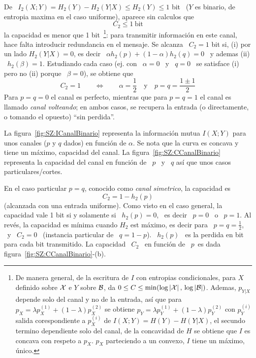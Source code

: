 %
\noindent De  \ $I_2(X;Y) = H_2(Y)  - H_2(Y|X) \le H_2(Y)  \le 1$ bit  \ ($Y$ es
binario, de entropia maxima en el caso uniforme), aparece sin calculos que
%
\[
C_2 \le 1 \: \mbox{bit}
\]
%
\ie la capacidad es menor que 1 bit~\footnote{De manera general, de la escritura
  de $I$ con  entropias condicionales, para $X$ definido sobre  $\mathcal{X}$ e $Y$ sobre
  $\mathcal{B}$, da $0 \le C \le \min( \log  |\mathcal{X}| \, , \, \log |\mathcal{B}| )$. Ademas, $p_{Y|X}$
  depende solo  del canal  y no  de la entrada,  as\'i que  para $p_X  = \lambda
  p_X^{(1)}  + (1-\lambda)  p_X^{(2)}$ se  obtiene  $p_Y =  \lambda p_Y^{(1)}  +
  (1-\lambda) p_Y^{(2)}$ con $p_Y^{(i)}$  salida corespondiente a $p_X^{(i)}$ de
  $I(X;Y) = H(Y)-H(Y|X)$,  el secundo termino dependiente solo  del canal, de la
  concavidad de  $H$ se obtiene  que $I$ es  concava con respeto a  $p_X$. $p_X$
  parteciendo a  un convexo, $I$  tiene un m\'aximo, \'unico.}:  para transmitir
informaci\'on en  este canal, hace  falta introducir redundancia en  el mensaje.
Se alcanza  \ $C_2  = 1$  bit si, (i)  por un  lado $H_2(Y|X) =  0$, es  decir \
$\alpha h_2(p)  + (1-\alpha) h_2(q)  = 0$  \ y ademas  (ii) \ $h_2(\beta)  = 1$.
Estudiando cada caso (ej.  con  \ $\alpha = 0$ \ y \ $q =  0$ \ se satisface (i)
pero no (ii) porque \ $\beta = 0$), se obtiene que
%
\[
C_2 = 1 \qquad \Leftrightarrow \qquad \alpha  = \frac12 \quad \mbox{y} \quad p = q
= \frac{1 \pm 1}{2}
\]
%
Para $p = q = 0$ el canal es perfecto, mientras que para $p = q = 1$ el canal es
llamado  {\it  canal volteando};  en  ambos casos,  se  recupera  la entrada  (o
directamente, o tomando el opuesto) ``sin perdida''.

La figura~\ref{fig:SZ:ICanalBinario} representa  la informaci\'on mutua $I(X;Y)$
para unos canales  ($p$ y $q$ dados)  en funci\'on de $\alpha$.  Se  nota que la
curva   es   concava  y   tiene   un   m\'aximo,   capacidad  del   canal.    La
figura~\ref{fig:SZ:CCanalBinario} representa la capacidad del canal en funci\'on
de \ $p$ \ y \ $q$ as\'i que unos casos particulares/cortes.

En el caso particular $p = q$, conocido como {\it canal simetrico}, la capacidad
es
%
\[
C_2 = 1 - h_2(p)
\]
%
(alcanzada  con  una entrada  uniforme).   Como visto  en  el  caso general,  la
capacidad vale 1 bit si y solamente si \ $h_2(p)  = 0$, \ es decir \ $p = 0$ \ o
\ $p = 1$.   Al rev\'es, la capacidad es m\'inima cuando  $H_2$ est m\'aximo, es
decir para \ $p = q = \frac12$, \  y \ $C_2 = 0$ \ (instancia particular de \ $q
=  1-p$). \  $h_2(p)$ \  es la  perdida  en bit  para cada  bit transmitido.  La
capacidad    \    $C_2$    \    en    funci\'on    de    \    $p$\    es    dada
figura~\ref{fig:SZ:CCanalBinario}-(b).

